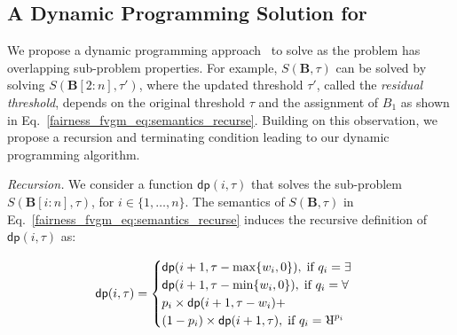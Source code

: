 \iffalse
\red{The decision version of computing the maximum (minimum) PPV is to decide whether there is an assignment of \textit{sensitive} or \textit{choice variables}, for which the \textit{non-sensitive} or \textit{chance variables} yield a PPV greater or less than $\alpha \in [0,1]$. Now, we formally state the hardness of verifying linear classifiers followed by an efficient dynamic programming solution.
\begin{lemma}
	\label{fairness_fvgm_lm:hardness}
	The decision version of the fairness verification problem for linear classifiers is in $\mathrm{NP^{PP}}$.
\end{lemma}}
\fi

 
 
 \subsection{A Dynamic Programming Solution for {\stochastic}}
 \label{fairness_fvgm_sec:dp_formulation}

We propose a dynamic programming approach~\cite{pisinger1999linear,woeginger1992equal} to solve {\stochastic} as the problem has overlapping sub-problem properties. 
For example, $S(\mathbf{B}, \tau)$ can be solved by solving $S(\mathbf{B}[2:n], \tau')$, where the updated threshold $\tau'$, called the \textit{residual threshold}, depends on the original threshold $\tau$ and the assignment of $B_1$ as shown in Eq.~\eqref{fairness_fvgm_eq:semantics_recurse}.
Building on this observation, we propose a recursion and terminating condition leading to our dynamic programming algorithm. 

\textit{Recursion.} We consider a function $ \mathsf{dp}(i, \tau) $ that solves the sub-problem $ S(\mathbf{B}[i:n],\tau)  $, for $ i \in \{1,\ldots,n\}  $. The semantics of  $ S(\mathbf{B},\tau) $ in Eq.~\eqref{fairness_fvgm_eq:semantics_recurse} induces the recursive definition of $ \mathsf{dp}(i,\tau) $ as: 

\begin{align}\label{fairness_fvgm_eq:dp_recurse}
 \mathsf{dp}(i,\tau)=
 \begin{cases}
 \mathsf{dp}(i+1, \tau-\max\{w_i, 0\}), \; \text{if } q_i = \exists\\
 \mathsf{dp}(i+1, \tau-\min\{w_i, 0\}), \; \text{if } q_i = \forall\\
 p_i \times \mathsf{dp}(i+1, \tau-w_i) + \\ (1- p_i) \times \mathsf{dp}(i+1, \tau) ,\; \text{if } q_i = \R^{p_i}
 \end{cases}
\end{align} 

